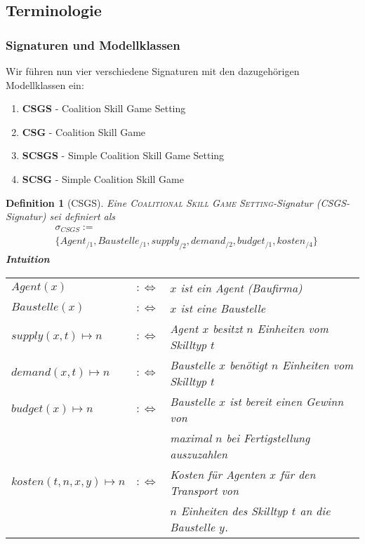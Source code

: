 \documentclass[12pt]{article}
\theoremstyle{break}
\newtheorem{definition}{Definition}
\begin{document}
\subsection{Terminologie}
\label{sigmod}

\subsubsection{Signaturen und Modellklassen}
Wir führen nun vier verschiedene Signaturen mit den dazugehörigen Modellklassen ein:
\begin{enumerate}
  \item \textbf{CSGS} - Coalition Skill Game Setting
  \item \textbf{CSG} - Coalition Skill Game
  \item \textbf{SCSGS} - Simple Coalition Skill Game Setting
  \item \textbf{SCSG} - Simple Coalition Skill Game
\end{enumerate}

\begin{definition}[CSGS]
  Eine \textsc{Coalitional Skill Game Setting}-Signatur (CSGS-Signatur) sei definiert als
  \begin{align*}
    &\sigma_{CSGS}:= \\
    &\{Agent_{/1}, Baustelle_{/1}, supply_{/2}, demand_{/2}, budget_{/1}, kosten_{/4} \}
  \end{align*}
  \noindent
  \textbf{Intuition} \\
    \begin{tabular}{lrl}
    $Agent(x)$&$:\Leftrightarrow$& $x$ ist ein Agent (Baufirma) \\
    $Baustelle(x) $&$:\Leftrightarrow$& $x$ ist eine Baustelle \\
    $supply(x, t)\mapsto n $&$:\Leftrightarrow$& Agent $x$ besitzt $n$ Einheiten vom Skilltyp $t$ \\
    $demand(x, t)\mapsto n $&$:\Leftrightarrow$& Baustelle $x$ benötigt $n$ Einheiten vom Skilltyp $t$ \\
    $budget(x)\mapsto n $&$:\Leftrightarrow$&
    Baustelle $x$ ist bereit einen Gewinn von \\&&maximal $n$ bei Fertigstellung auszuzahlen\\
    $kosten(t, n, x, y)\mapsto n$&$:\Leftrightarrow$& Kosten für Agenten $x$ für den Transport von \\&&$n$ Einheiten des Skilltyp $t$ an die Baustelle $y$.
    \end{tabular}
\end{definition}
\end{document}
